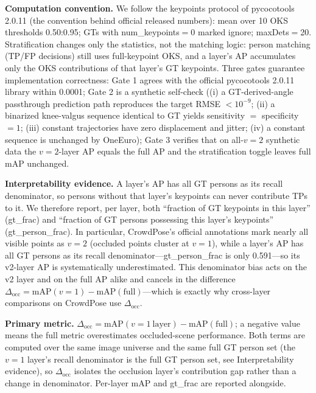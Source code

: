 \documentclass[10pt,conference]{IEEEtran}
\begin{document}
\textbf{Computation convention.} We follow the keypoints protocol of pycocotools 2.0.11 (the convention behind official released numbers): mean over 10 OKS thresholds 0.50:0.95; GTs with num\_keypoints$=$0 marked ignore; maxDets$=$20. Stratification changes only the statistics, not the matching logic: person matching (TP/FP decisions) still uses full-keypoint OKS, and a layer's AP accumulates only the OKS contributions of that layer's GT keypoints. Three gates guarantee implementation correctness: Gate 1 agrees with the official pycocotools 2.0.11 library within 0.0001; Gate 2 is a synthetic self-check ((i) a GT-derived-angle passthrough prediction path reproduces the target RMSE $<10^{-9}$; (ii) a binarized knee-valgus sequence identical to GT yields sensitivity $=$ specificity $=1$; (iii) constant trajectories have zero displacement and jitter; (iv) a constant sequence is unchanged by OneEuro); Gate 3 verifies that on all-$v{=}2$ synthetic data the $v{=}2$-layer AP equals the full AP and the stratification toggle leaves full mAP unchanged.

\textbf{Interpretability evidence.} A layer's AP has all GT persons as its recall denominator, so persons without that layer's keypoints can never contribute TPs to it. We therefore report, per layer, both ``fraction of GT keypoints in this layer'' (gt\_frac) and ``fraction of GT persons possessing this layer's keypoints'' (gt\_person\_frac). In particular, CrowdPose's official annotations mark nearly all visible points as $v{=}2$ (occluded points cluster at $v{=}1$), while a layer's AP has all GT persons as its recall denominator---gt\_person\_frac is only 0.591---so its v2-layer AP is systematically underestimated. This denominator bias acts on the v2 layer and on the full AP alike and cancels in the difference $\Delta_{\mathrm{occ}}=\mathrm{mAP}(v{=}1)-\mathrm{mAP}(\mathrm{full})$---which is exactly why cross-layer comparisons on CrowdPose use $\Delta_{\mathrm{occ}}$.

\textbf{Primary metric.} $\Delta_{\mathrm{occ}}=\mathrm{mAP}(v{=}1\ \mathrm{layer})-\mathrm{mAP}(\mathrm{full})$; a negative value means the full metric overestimates occluded-scene performance. Both terms are computed over the same image universe and the same full GT person set (the $v{=}1$ layer's recall denominator is the full GT person set, see Interpretability evidence), so $\Delta_{\mathrm{occ}}$ isolates the occlusion layer's contribution gap rather than a change in denominator. Per-layer mAP and gt\_frac are reported alongside.
\end{document}
